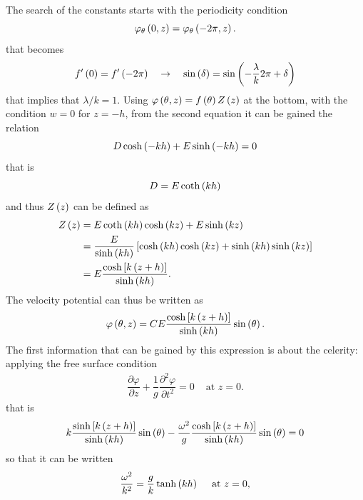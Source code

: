 The search of the constants starts with the periodicity condition
\begin{equation*}
\varphi_{\theta}\left( 0,z \right)=\varphi_{\theta}\left( -2\pi,z \right).
\end{equation*}
that becomes
\begin{equation*}
f'\left( 0 \right)=f'\left( -2\pi \right) \quad\rightarrow\quad \sin\left( \delta \right)=\sin\left( -\dfrac{\lambda}{k}2\pi+\delta \right)
\end{equation*}
that implies that $\lambda/k=1$. Using $\varphi\left( \theta,z \right)=f\left( \theta \right)Z\left( z \right)$ at the bottom, with the condition $w=0$ for $z=-h$, from the second equation it can be gained the relation 
\begin{equation*}
D\cosh\left( -k h \right)+E\sinh\left( -k h \right)=0
\end{equation*}
that is 
\begin{equation*}
D=E\coth\left( k h \right)
\end{equation*}
and thus $Z\left( z \right)$ can be defined as
\begin{align*}
Z\left( z \right)&=E\coth\left( k h \right)\cosh\left( k  z \right)+E\sinh\left( k  z \right)\\
&=\dfrac{E}{\sinh\left( k h \right)}\left[ \cosh\left( k  h \right)\cosh\left( k  z \right)+\sinh\left( k  h \right)\sinh\left( k  z \right) \right]\\
&=E\dfrac{\cosh\left[ k \left( z+h \right) \right]}{\sinh\left( k  h \right)}.
\end{align*}
The velocity potential can thus be written as
\begin{equation}
\varphi\left( \theta,z \right)=CE\dfrac{\cosh\left[ k \left( z+h \right) \right]}{\sinh\left( k  h \right)}\sin\left( \theta \right).
\end{equation}
The first information that can be gained by this expression is about the celerity: applying the free surface condition 
\begin{equation*}
\begin{array}{ll}
\dfrac{\partial \varphi}{\partial z} + \dfrac{1}{g}\dfrac{\partial^{2} \varphi}{\partial t^{2}}=0 & \text{ at } z=0.
\end{array}
\end{equation*}
that is 
\begin{equation*}
k\dfrac{\sinh\left[ k \left( z+h \right) \right]}{\sinh\left( k  h \right)}\sin\left( \theta \right)-\dfrac{\omega^{2}}{g}\dfrac{\cosh\left[ k \left( z+h \right) \right]}{\sinh\left( k  h \right)}\sin\left( \theta \right)=0
\end{equation*}
so that it can be written
\begin{equation}
\dfrac{\omega^{2}}{k^{2}}=\dfrac{g}{k}\tanh\left( kh \right) \quad \text{ at } z=0,
\end{equation}
